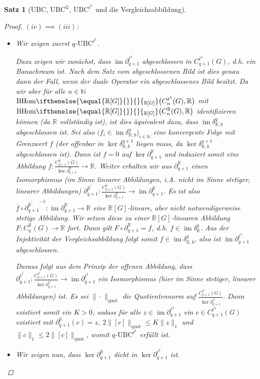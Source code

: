 \documentclass[a4paper,twoside,10pt]{scrreprt}
\DeclareMathOperator{\img}{im}
\newcommand{\UBC}{\text{UBC}}
\newcommand{\N}{\mathbb{N}}
\newcommand{\Q}{\mathbb{Q}}
\newcommand{\R}{\mathbb{R}}
\newcommand{\BHom}[2][]{\text{BHom}%
\ifthenelse{\equal{#1}{}}{}{_{#1}}%
\bigl(#2\bigr)}%
\newtheorem{satz}{Satz}[section]
\theoremstyle{definition}
\begin{document}
\begin{satz}[UBC, $\UBC^{\Q}$, $\UBC^{\ell^1}$ und die Vergleichsabbildung]
\begin{proof}
$(iv)\implies (iii)$:
\begin{itemize}
\item Wir zeigen zuerst $q$-$\text{UBC}^{\ell^1}$.\par
Dazu zeigen wir zunächst, dass $\img \partial_{q+1}^{\ell^1}$ abgeschlossen in $C_{q+1}^{\ell^1}(G)$, d.h. ein Banachraum ist. Nach dem Satz vom abgeschlossenen Bild ist dies genau dann der Fall, wenn der duale Operator ein abgeschlossenes Bild besitzt. Da wir aber für alle $n\in \N$ $\BHom[\R{[}G{]}]{C_n^{\ell^1}(G),\R}$ mit $\BHom[\R{[}G{]}]{C_n^{\R}(G),\R}$ identifizieren können (da $\R$ vollständig ist), ist dies äquivalent dazu, dass $\img\delta_{\R,b}^q$ abgeschlossen ist. Sei also $\bigl(f_i\in \img \delta_{\R,b}^q\bigr)_{i\in \N}$ eine konvergente Folge mit Grenzwert $f$ (der offenbar in $\ker \delta_{\R,b}^{q+1}$ liegen muss, da $\ker \delta_{\R,b}^{q+1}$ abgeschlossen ist). Dann ist $f=0$ auf $\ker \partial_{q+1}^{\R}$ und induziert somit eine Abbildung $\overline{f}:\frac{C_{q+1}^{\R}(G)}{\ker \partial_{q+1}^{\R}}\to \R$. Weiter erhalten wir aus $\partial_{q+1}^{\R}$ einen Isomorphismus (im Sinne linearer Abbildungen, i.A. nicht im Sinne stetiger, linearer Abbildungen) $\overline{\partial_{q+1}^{\R}}:\frac{C_{q+1}^{\R}(G)}{\ker \partial_{q+1}^{\R}}\to \img \partial_{q+1}^{\R}$. Es ist also $\overline{f}\circ\overline{\partial_{q+1}^{\R}}^{-1}:\img \partial_{q+1}^{\R}\to \R$ eine $\R[G]$-lineare, aber nicht notwendigerweise stetige Abbildung.
Wir setzen diese zu einer $\R[G]$-linearen Abbildung $F:C_q^{\R}(G)\to \R$ fort.
Dann gilt $F\circ \partial_{q+1}^{\R}=f$, d.h. $f\in \img \delta_{\R}^q$. Aus der Injektivität der Vergleichsabbildung folgt somit $f\in \img \delta_{\R,b}^q$, also ist $\img \partial_{q+1}^{\ell^1}$ abgeschlossen.\par
Daraus folgt aus dem Prinzip der offenen Abbildung, dass $\overline{\partial_{q+1}^{\ell^1}}:\frac{C_{q+1}^{\ell^1}(G)}{\ker \partial_{q+1}^{\ell^1}}\to \img \partial_{q+1}^{\ell^1}$ ein Isomorphismus (hier im Sinne stetiger, linearer Abbildungen) ist. Es sei $\|\cdot\|_{\text{quot}}$ die Quotientennorm auf $\frac{C_{q+1}^{\ell^1}(G)}{\ker \partial_{q+1}^{\ell^1}}$. Dann existiert somit ein $K>0$, sodass für alle $z\in \img \partial_{q+1}^{\ell^1}$ ein $c\in C_{q+1}^{\ell^1}(G)$ existiert mit $\partial_{q+1}^{\R}(c)=z$, $2\|[c]\|_{\text{quot}}\leq K\|z\|_1$ und $\|c\|_1\leq 2\|[c]\|_{\text{quot}}$, womit $q$-$\text{UBC}^{\ell^1}$ erfüllt ist.\par
\item Wir zeigen nun, dass $\ker \partial_{q+1}^{\R}$ dicht in $\ker \partial_{q+1}^{\ell^1}$ ist.\par

\end{itemize}
\end{proof}
\end{satz}
\end{document}
